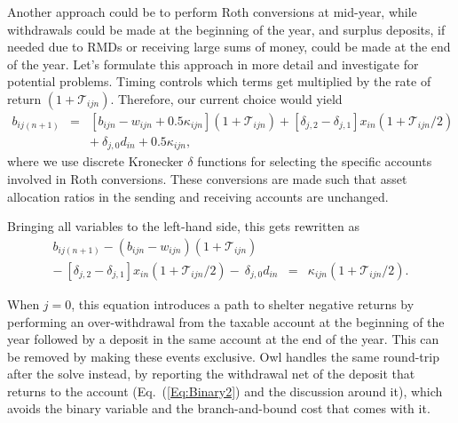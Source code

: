 \documentclass[fleqn,12pt]{report}
\begin{document}
	Another approach could be to perform Roth conversions at mid-year, while withdrawals
	could be made at the beginning of the year, and surplus deposits,
	if needed due to RMDs or receiving large sums of money,
	could be made at the end of the year. Let's formulate this approach
	in more detail and investigate for potential problems.
	Timing controls which terms get multiplied by the rate of return $(1 + \mathcal{T}_{ijn})$.
	Therefore, our current choice would yield
	\begin{eqnarray}
		\label{Eq:C3a}
		b_{ij(n+1)} &=& [b_{ijn} - w_{ijn} + 0.5\kappa_{ijn}](1 + \mathcal{T}_{ijn})
		+ [\delta_{j, 2} - \delta_{j, 1} ]x_{in} (1 + \mathcal{T}_{ijn}/2)
		\nonumber \\
		&& 
		+\ \delta_{j, 0} d_{in} + 0.5 \kappa_{ijn},
	\end{eqnarray}
	where we use discrete Kronecker $\delta$ functions for selecting the specific accounts involved
	in Roth conversions. These conversions are made such that asset allocation
	ratios in the sending and receiving accounts are unchanged.

	Bringing all variables
	to the left-hand side, this gets rewritten as
	\begin{eqnarray}
		\label{Eq:C3}
		b_{ij(n+1)} - (b_{ijn} - w_{ijn}) (1 + \mathcal{T}_{ijn})
		&& \nonumber \\
		-\ [\delta_{j, 2} - \delta_{j, 1}]x_{in}(1 + \mathcal{T}_{ijn}/2)
		-\ \delta_{j, 0} d_{in}
		&=& \kappa_{ijn} (1 + \mathcal{T}_{ijn}/2).
	\end{eqnarray}

	When $j=0$, this equation introduces
	a path to shelter negative returns by performing an over-withdrawal from the taxable
	account at the beginning of the year followed by a deposit in the
	same account at the end of the year. This can 
	be removed by making these events exclusive. Owl handles the same round-trip after the
	solve instead, by reporting the withdrawal net of the deposit that returns to the account
	(Eq.~(\ref{Eq:Binary2}) and the discussion around it), which avoids the binary variable
	and the branch-and-bound cost that comes with it.
\end{document}
